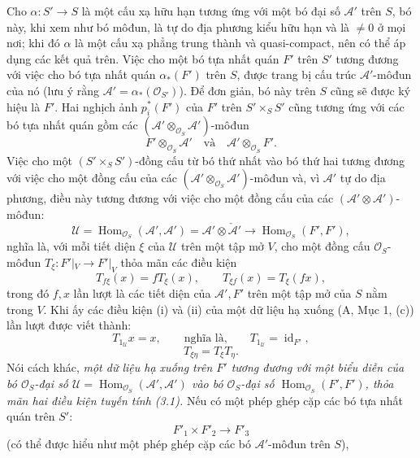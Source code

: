 \documentclass[11pt,twoside,openany]{book}
\numberwithin{equation}{section}
\begin{document}
Cho $\alpha:S'\longrightarrow S$ là một cấu xạ hữu hạn tương ứng với một bó
đại số $\mathcal A'$ trên $S$, bó này, khi xem như bó môđun, là tự do địa phương
kiểu hữu hạn và là $\ne0$ ở mọi nơi; khi đó $\alpha$ là một cấu xạ phẳng trung
thành và quasi-compact, nên có thể áp dụng các kết quả trên. Việc cho một bó
tựa nhất quán $F'$ trên $S'$ tương đương với việc cho bó tựa nhất quán
$\alpha_*(F')$ trên $S$, được trang bị cấu trúc $\mathcal A'$-môđun của nó
(lưu ý rằng $\mathcal A'=\alpha_*(\mathcal O_{S'})$). Để đơn giản, bó này trên
$S$ cũng sẽ được ký hiệu là $F'$. Hai nghịch ảnh $p_i^*(F')$ của $F'$ trên
$S'\times_SS'$ cũng tương ứng với các bó tựa nhất quán gồm các
$(\mathcal A'\otimes_{\mathcal O_S}\mathcal A')$-môđun
\[
  F'\otimes_{\mathcal O_S}\mathcal A'
  \quad\text{và}\quad
  \mathcal A'\otimes_{\mathcal O_S}F'.
\]
Việc cho một $(S'\times_SS')$-đồng cấu từ bó thứ nhất vào bó thứ hai tương
đương với việc cho một đồng cấu của các
$(\mathcal A'\otimes_{\mathcal O_S}\mathcal A')$-môđun và, vì $\mathcal A'$
tự do địa phương, điều này tương đương với việc cho một đồng cấu của các
$(\mathcal A'\otimes\mathcal A')$-môđun:
\[
  \mathcal U=
  \operatorname{Hom}_{\mathcal O_S}(\mathcal A',\mathcal A')
  =\mathcal A'\otimes\check{\mathcal A}'
  \longrightarrow
  \operatorname{Hom}_{\mathcal O_S}(F',F'),
\]
nghĩa là, với mỗi tiết diện $\xi$ của $\mathcal U$ trên một tập mở $V$, cho một
đồng cấu $\mathcal O_S$-môđun
$T_\xi:F'|_V\longrightarrow F'|_V$ thỏa mãn các điều kiện
\begin{equation}
  T_{f\xi}(x)=fT_\xi(x),
  \qquad T_{\xi f}(x)=T_\xi(fx),
  \tag{3.1}
\end{equation}
trong đó $f,x$ lần lượt là các tiết diện của $\mathcal A',F'$ trên một tập mở
của $S$ nằm trong $V$. Khi ấy các điều kiện (i) và (ii) của một dữ liệu hạ xuống
(A, Mục 1, (c)) lần lượt được viết thành:
\begin{equation}
  T_{1_{\mathcal U}}x=x,
  \qquad\text{nghĩa là,}\qquad
  T_{1_{\mathcal U}}=\operatorname{id}_{F'},
  \tag{3.2}
\end{equation}
\begin{equation}
  T_{\xi\eta}=T_\xi T_\eta.
  \tag{3.3}
\end{equation}
Nói cách khác, \emph{một dữ liệu hạ xuống trên $F'$ tương đương với một biểu
diễn của bó $\mathcal O_S$-đại số
$\mathcal U=\operatorname{Hom}_{\mathcal O_S}(\mathcal A',\mathcal A')$ vào
bó $\mathcal O_S$-đại số
$\operatorname{Hom}_{\mathcal O_S}(F',F')$, thỏa mãn hai điều kiện tuyến tính
(3.1).} Nếu có một phép ghép cặp các bó tựa nhất quán trên $S'$:
\[
  F'_1\times F'_2\longrightarrow F'_3
\]
(có thể được hiểu như một phép ghép cặp các bó $\mathcal A'$-môđun trên $S$),
\end{document}
